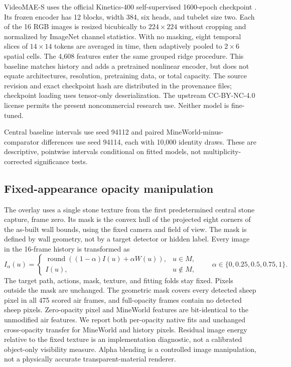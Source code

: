 VideoMAE-S uses the official Kinetics-400 self-supervised 1600-epoch checkpoint
\citep{tong2022videomae}. Its frozen encoder has 12 blocks, width 384, six heads,
and tubelet size two. Each of the 16 RGB images is resized bicubically to
$224\times224$ without cropping and normalized by ImageNet channel statistics.
With no masking, eight temporal slices of $14\times14$ tokens are averaged in
time, then adaptively pooled to $2\times6$ spatial cells. The 4,608 features enter
the same grouped ridge procedure. This baseline matches history and adds a
pretrained nonlinear encoder, but does not equate architectures, resolution,
pretraining data, or total capacity. The source revision and exact checkpoint hash
are distributed in the provenance files; checkpoint loading uses tensor-only
deserialization. The upstream CC-BY-NC-4.0 license permits the present
noncommercial research use. Neither model is fine-tuned.

Central baseline intervals use seed 94112 and paired MineWorld-minus-comparator
differences use seed 94114, each with 10,000 identity draws. These are descriptive,
pointwise intervals conditional on fitted models, not multiplicity-corrected
significance tests.

\subsection{Fixed-appearance opacity manipulation}
The overlay uses a single stone texture from the first predetermined central
stone capture, frame zero. Its mask is the convex hull of the projected eight
corners of the as-built wall bounds, using the fixed camera and field of view.
The mask is defined by wall geometry, not by a target detector or hidden label.
Every image in the 16-frame history is transformed as
\[
I_{\alpha}(u) =
\begin{cases}
\operatorname{round}((1-\alpha)I(u)+\alpha W(u)), & u\in M,\\
I(u), & u\notin M,
\end{cases}
\qquad \alpha\in\{0,0.25,0.5,0.75,1\}.
\]
The target path, actions, mask, texture, and fitting folds stay fixed. Pixels
outside the mask are unchanged. The geometric mask covers every detected sheep
pixel in all 475 scored air frames, and full-opacity frames contain no detected
sheep pixels. Zero-opacity pixel and MineWorld features are bit-identical to the
unmodified air features. We report both per-opacity native fits and unchanged
cross-opacity transfer for MineWorld and history pixels. Residual image energy
relative to the fixed texture is an implementation diagnostic, not a calibrated
object-only visibility measure. Alpha blending is a controlled image manipulation,
not a physically accurate transparent-material renderer.


